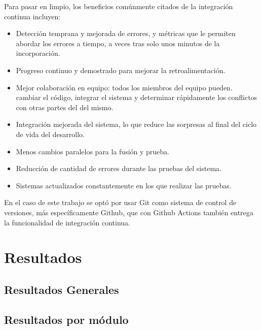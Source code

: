 Para pasar en limpio, los beneficios comúnmente citados de la integración
continua incluyen:
\begin{itemize}
  \item Detección temprana y mejorada de errores, y métricas que le permiten
  abordar los errores a tiempo, a veces tras solo unos minutos de la incorporación.
  \item Progreso continuo y demostrado para mejorar la retroalimentación.
  \item Mejor colaboración en equipo: todos los miembros del equipo pueden.
  cambiar el código, integrar el sistema y determinar rápidamente los conflictos
  con otras partes del del mismo.
  \item Integración mejorada del sistema, lo que reduce las sorpresas al final
  del ciclo de vida del desarrollo.
  \item Menos cambios paralelos para la fusión y prueba.
  \item Reducción de cantidad de errores durante las pruebas del sistema.
  \item Sistemas actualizados constantemente en los que realizar las pruebas.
\end{itemize}

En el caso de este trabajo se optó por usar Git como sistema de control de
versiones, más específicamente Github, que con Github Actions también entrega
la funcionalidad de integración continua.


\section{Resultados}

\subsection{Resultados Generales}

\subsection{Resultados por módulo}
